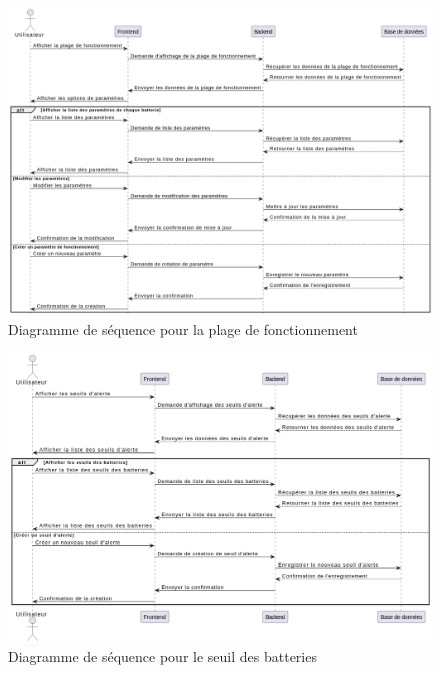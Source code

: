 \begin{figure}[H]
	\centering
	\includegraphics[width=15cm]{./img/composants/diagramme/seq/4seqplagefon.png}
	\caption{Diagramme de séquence pour la plage de fonctionnement}
\end{figure}
\begin{figure}[H]
	\centering
	\includegraphics[width=15cm]{./img/composants/diagramme/seq/seuil.png}
	\caption{Diagramme de séquence pour le seuil des batteries}
\end{figure}
